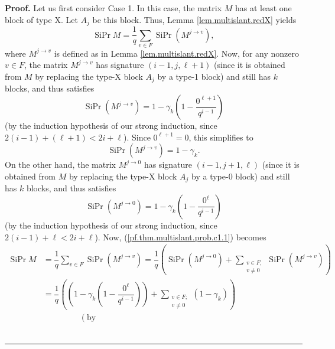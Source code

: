 \documentclass[numbers=enddot,12pt,final,onecolumn,notitlepage]{scrartcl}%
\theoremstyle{definition}
\newenvironment{proof}[1][Proof]{\noindent\textbf{#1.} }{\ \rule{0.5em}{0.5em}}
\let\sumnonlimits\sum
\renewcommand{\sum}{\sumnonlimits\limits}
\theoremstyle{plainsl}
\begin{document}
\begin{proof}
Let us first consider Case 1. In this case, the matrix $M$ has at least one
block of type X. Let $A_{j}$ be this block. Thus, Lemma
\ref{lem.multislant.redX} yields%
\begin{equation}
\operatorname*{SiPr}M=\dfrac{1}{q}\sum_{v\in F}\operatorname*{SiPr}\left(
M^{j\rightarrow v}\right)  , \label{pf.thm.multislant.prob.c1.1}%
\end{equation}
where $M^{j\rightarrow v}$ is defined as in Lemma \ref{lem.multislant.redX}.
Now, for any nonzero $v\in F$, the matrix $M^{j\rightarrow v}$ has signature
$\left(  i-1,j,\ell+1\right)  $ (since it is obtained from $M$ by replacing
the type-X block $A_{j}$ by a type-1 block) and still has $k$ blocks, and thus
satisfies%
\[
\operatorname*{SiPr}\left(  M^{j\rightarrow v}\right)  =1-\gamma_{k}\left(
1-\dfrac{0^{\ell+1}}{q^{i-1}}\right)
\]
(by the induction hypothesis of our strong induction, since $2\left(
i-1\right)  +\left(  \ell+1\right)  <2i+\ell$). Since $0^{\ell+1}=0$, this
simplifies to%
\begin{equation}
\operatorname*{SiPr}\left(  M^{j\rightarrow v}\right)  =1-\gamma_{k}.
\label{pf.thm.multislant.prob.c1.2}%
\end{equation}
On the other hand, the matrix $M^{j\rightarrow0}$ has signature $\left(
i-1,j+1,\ell\right)  $ (since it is obtained from $M$ by replacing the type-X
block $A_{j}$ by a type-0 block) and still has $k$ blocks, and thus satisfies%
\begin{equation}
\operatorname*{SiPr}\left(  M^{j\rightarrow0}\right)  =1-\gamma_{k}\left(
1-\dfrac{0^{\ell}}{q^{i-1}}\right)  \label{pf.thm.multislant.prob.c1.3}%
\end{equation}
(by the induction hypothesis of our strong induction, since $2\left(
i-1\right)  +\ell<2i+\ell$). Now, (\ref{pf.thm.multislant.prob.c1.1}) becomes%
\begin{align*}
\operatorname*{SiPr}M  &  =\dfrac{1}{q}\sum_{v\in F}\operatorname*{SiPr}%
\left(  M^{j\rightarrow v}\right)  =\dfrac{1}{q}\left(  \operatorname*{SiPr}%
\left(  M^{j\rightarrow0}\right)  +\sum_{\substack{v\in F;\\v\neq
0}}\operatorname*{SiPr}\left(  M^{j\rightarrow v}\right)  \right) \\
&  =\dfrac{1}{q}\left(  \left(  1-\gamma_{k}\left(  1-\dfrac{0^{\ell}}%
{q^{i-1}}\right)  \right)  +\sum_{\substack{v\in F;\\v\neq0}}\left(
1-\gamma_{k}\right)  \right) \\
&  \ \ \ \ \ \ \ \ \ \ \ \ \ \ \ \ \ \ \ \ \left(  \text{by
}
\end{align*}
\end{proof}
\end{document}
